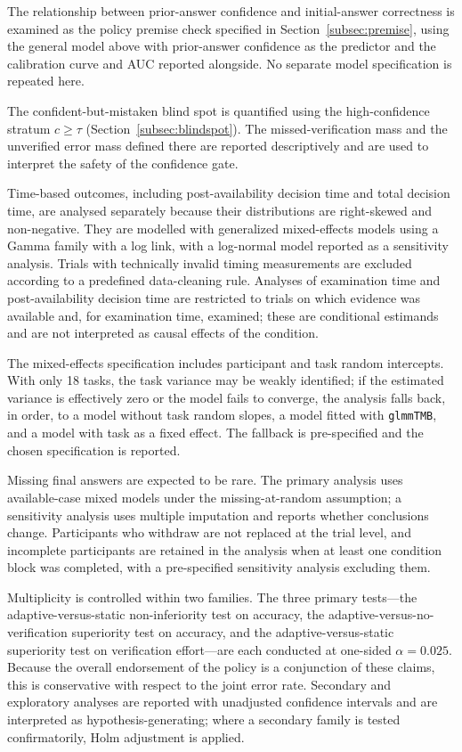 \documentclass[oneside,final,14pt,a4paper]{extreport}
\begin{document}
The relationship between prior-answer confidence and initial-answer
correctness is examined as the policy premise check specified in
Section~\ref{subsec:premise}, using the general model above with prior-answer
confidence as the predictor and the calibration curve and AUC reported
alongside. No separate model specification is repeated here.

The confident-but-mistaken blind spot is quantified using the high-confidence
stratum $c\geq\tau$ (Section~\ref{subsec:blindspot}). The missed-verification
mass and the unverified error mass defined there are reported descriptively
and are used to interpret the safety of the confidence gate.

Time-based outcomes, including post-availability decision time and total
decision time, are analysed separately because their distributions are
right-skewed and non-negative. They are modelled with generalized
mixed-effects models using a Gamma family with a log link, with a log-normal
model reported as a sensitivity analysis. Trials with technically invalid
timing measurements are excluded according to a predefined data-cleaning rule.
Analyses of examination time and post-availability decision time are
restricted to trials on which evidence was available and, for examination
time, examined; these are conditional estimands and are not interpreted as
causal effects of the condition.

The mixed-effects specification includes participant and task random
intercepts. With only 18 tasks, the task variance may be weakly identified; if
the estimated variance is effectively zero or the model fails to converge,
the analysis falls back, in order, to a model without task random slopes, a
model fitted with \texttt{glmmTMB}, and a model with task as a fixed effect.
The fallback is pre-specified and the chosen specification is reported.

Missing final answers are expected to be rare. The primary analysis uses
available-case mixed models under the missing-at-random assumption; a
sensitivity analysis uses multiple imputation and reports whether conclusions
change. Participants who withdraw are not replaced at the trial level, and
incomplete participants are retained in the analysis when at least one
condition block was completed, with a pre-specified sensitivity analysis
excluding them.

Multiplicity is controlled within two families. The three primary
tests---the adaptive-versus-static non-inferiority test on accuracy, the
adaptive-versus-no-verification superiority test on accuracy, and the
adaptive-versus-static superiority test on verification effort---are each
conducted at one-sided $\alpha=0.025$. Because the overall endorsement of the
policy is a conjunction of these claims, this is conservative with respect to
the joint error rate. Secondary
and exploratory analyses are reported with unadjusted confidence intervals and
are interpreted as hypothesis-generating; where a secondary family is tested
confirmatorily, Holm adjustment is applied.
\end{document}
